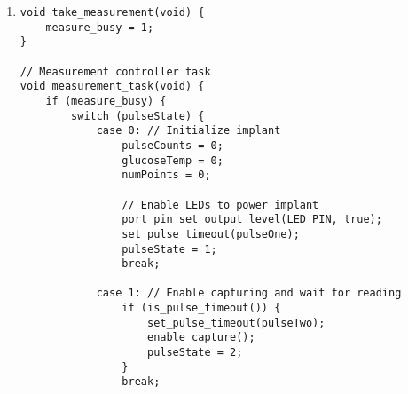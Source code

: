 \begin{enumerate}[label=\textbf{S.\arabic*},ref=S.\arabic*{ of Appendix A}]
\begin{adjustwidth}{-2em}{0pt}
\begin{lstlisting}
        adc_result = result;
        if (result != 0) {
            // Precompute the level assuming the same max used last time
            battery_level = (int16_t)(((float)result*MAX_V/MAX_ADC - MIN_V)/(MAX_V-MIN_V)*(float)last_max);
            if (battery_level < 1) battery_level = 1;
            if (battery_level > last_max) battery_level = last_max;
        }
        adc_active = 0;
    }
}

int get_battery_level(int max) {
    if (max == last_max) {
        // Return precomputed level if the max has not changed
        return battery_level;
    }
    last_max = max;
    battery_level = (int16_t)(((float)adc_result*MAX_V/MAX_ADC - MIN_V)/(MAX_V-MIN_V)*(float)max);
    if (battery_level < 1) battery_level = 1;
    if (battery_level > max) battery_level = max;
    return battery_level;
}

void start_battery_read(void) {
    if (!adc_active) {
        adc_active = 1;
        adc_enable(&adc_instance);
        adc_start_conversion(&adc_instance);
    }
}
\end{lstlisting}
\end{adjustwidth}
\doublespacing

\item \label{measurement_task}
\begin{adjustwidth}{-2em}{0pt}
\singlespacing
\nl
\begin{lstlisting}
void take_measurement(void) {
    measure_busy = 1;
}

// Measurement controller task
void measurement_task(void) {
    if (measure_busy) {
        switch (pulseState) {
            case 0: // Initialize implant
                pulseCounts = 0;
                glucoseTemp = 0;
                numPoints = 0;

                // Enable LEDs to power implant
                port_pin_set_output_level(LED_PIN, true);
                set_pulse_timeout(pulseOne);
                pulseState = 1;
                break;

            case 1: // Enable capturing and wait for reading
                if (is_pulse_timeout()) {
                    set_pulse_timeout(pulseTwo);
                    enable_capture();
                    pulseState = 2;
                }
                break;


\end{lstlisting}
\end{adjustwidth}
\end{enumerate}
